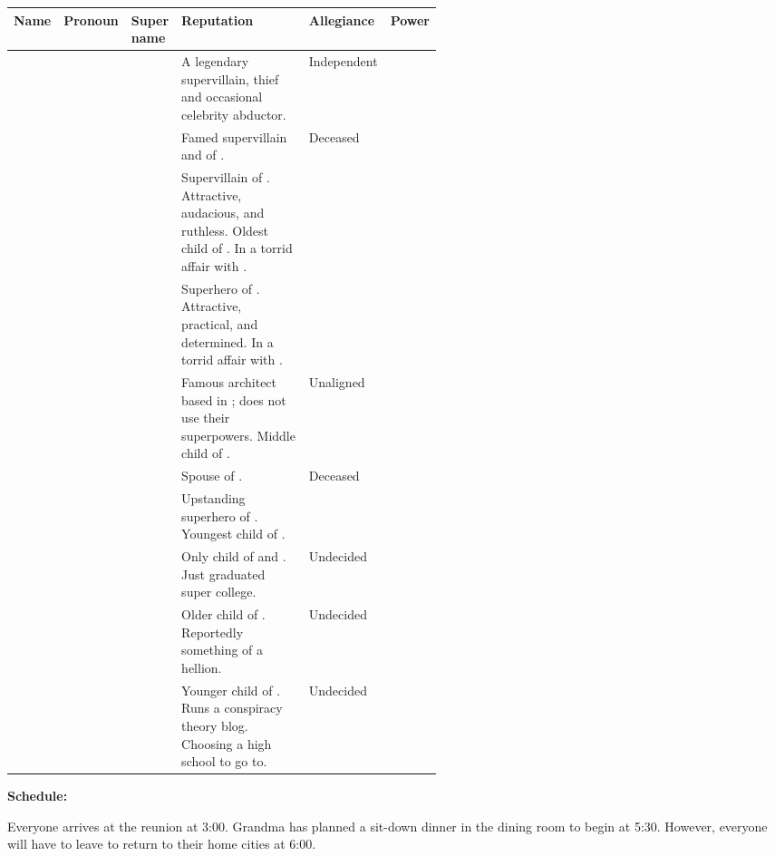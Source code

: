\documentclass[blue]{LRSguildcamp1}
\begin{document}
\begin{tabular}{l|l|l|p{0.35\linewidth}|p{0.1\linewidth}|p{0.1\linewidth}}
{\bf Name} & {\bf Pronoun} & {\bf Super name} & {\bf Reputation} & {\bf Allegiance} & {\bf Power} \\ \hline
\cGrandma{\intro} & \cGrandma{\they} & \cGrandma{\MYsupername} & A legendary supervillain, thief and occasional celebrity abductor. & Independent \cGrandma{\villain} & 
\cGrandma{\MYsuperpower} \\ \hline
\cGS{\intro} & \cGS{\they} & \cGS{\MYsupername} & Famed supervillain and \cGS{\spouse} of \cGrandma{}.  & Deceased \cGS{\villain} & \cGS{\MYsuperpower} \\ \hline
\cOldest{\intro} & \cOldest{\they} & \cOldest{\MYsupername} & Supervillain of \pCityO{}. Attractive, audacious, and ruthless.  Oldest child of \cGrandma{\intro}. In a torrid affair with \cOS{}. & \cVillainCompact{\intro} & \cOldest{\MYsuperpower} \\ \hline
\cOS{\intro} & \cOS{\they} & \cOS{\MYsupername} &  Superhero of \pCityO{}.  Attractive, practical, and determined.  In a torrid affair with \cOldest{}. & \cHeroLeague{\intro} & \cOS{\MYsuperpower} \\ \hline
\cArchitect{\intro} & \cArchitect{\they} & \cArchitect{\MYsupername} & Famous architect based in \pCityArchitect{}; does not use their superpowers.  Middle child of \cGrandma{\intro}. & Unaligned & \cArchitect{\MYsuperpower} \\ \hline
\cAS{\intro} & \cAS{\they} & \cAS{\MYsupername} & Spouse of \cArchitect{}.  & Deceased \cAS{\hero} & \cAS{\MYsuperpower} \\ \hline
\cYoungest{\intro} & \cYoungest{\they} & \cYoungest{\MYsupername} & Upstanding superhero of \pCityYoungest{}.  Youngest child of \cGrandma{}. & \cHeroLeague{\intro} & \cYoungest{\MYsuperpower} \\ \hline
\cGrad{\intro} & \cGrad{\they} & \cGrad{\MYsupername} & Only child of \cOldest{} and \cOS{}.  Just graduated super college. & Undecided & \cGrad{\MYsuperpower} \\ \hline
\cTeen{\intro} & \cTeen{\they} & \cTeen{\MYsupername} & Older child of \cArchitect{}.  Reportedly something of a hellion. & Undecided & \cTeen{\MYsuperpower} \\ \hline
\cTween{\intro} & \cTween{\they} & \cTween{\MYsupername} & Younger child of \cArchitect{}. Runs a conspiracy theory blog.  Choosing a high school to go to. & Undecided & \cTween{\MYsuperpower} \\ \hline
\end{tabular}

{\bf Schedule:}

Everyone arrives at the reunion at 3:00.  Grandma has planned a sit-down dinner in the dining room to begin at 5:30.  However, everyone will have to leave to return to their home cities at 6:00.
\end{document}
